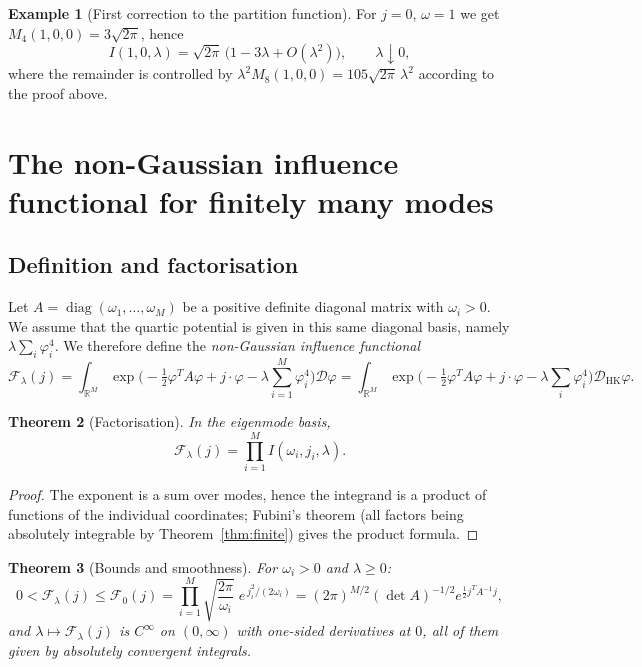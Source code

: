 \documentclass[11pt,a4paper]{article}
\theoremstyle{plain}
\newtheorem{theorem}{Theorem}[section]
\theoremstyle{definition}
\newtheorem{example}[theorem]{Example}
\theoremstyle{remark}
\newcommand{\dphi}{\mathcal{D}\varphi}
\newcommand{\dhk}{\mathcal{D}_{\mathrm{HK}}\varphi}
\newcommand{\R}{\mathbb{R}}
\begin{document}
\begin{example}[First correction to the partition function]
For $j=0$, $\omega=1$ we get $M_4(1,0,0)=3\sqrt{2\pi}$, hence
\[
I(1,0,\lambda)=\sqrt{2\pi}\,\big(1-3\lambda+O(\lambda^{2})\big),\qquad \lambda\downarrow0,
\]
where the remainder is controlled by $\lambda^{2}M_8(1,0,0)=105\sqrt{2\pi}\,\lambda^{2}$
according to the proof above.
\end{example}

\section{The non-Gaussian influence functional for finitely many modes}
\label{sec:influence}

\subsection{Definition and factorisation}

Let \(A = \operatorname{diag}(\omega_1,\dots,\omega_M)\) be a positive definite diagonal
matrix with \(\omega_i>0\). We assume that the quartic potential is given in this same
diagonal basis, namely \(\lambda\sum_i\varphi_i^4\). We therefore define the
\emph{non-Gaussian influence functional}
\begin{equation}
\label{eq:influence}
\mathcal{F}_\lambda(j)
=\int_{\R^{M}}
\exp\!\Big(-\tfrac12\varphi^{T}A\varphi+j\cdot\varphi-\lambda\sum_{i=1}^{M}\varphi_i^{4}\Big)\dphi
=\int_{\R^{M}}
\exp\!\Big(-\tfrac12\varphi^{T}A\varphi+j\cdot\varphi-\lambda\sum_{i}\varphi_i^{4}\Big)\dhk .
\end{equation}

\begin{theorem}[Factorisation]
\label{thm:factor}
In the eigenmode basis,
\[
\mathcal{F}_\lambda(j)=\prod_{i=1}^{M} I(\omega_i,j_i,\lambda).
\]
\end{theorem}

\begin{proof}
The exponent is a sum over modes, hence the integrand is a product of functions of the
individual coordinates; Fubini's theorem (all factors being absolutely integrable by
Theorem~\ref{thm:finite}) gives the product formula.
\end{proof}

\begin{theorem}[Bounds and smoothness]
\label{thm:influencebounds}
For $\omega_i>0$ and $\lambda\ge0$:
\[
0<\mathcal{F}_\lambda(j)\le\mathcal{F}_0(j)
=\prod_{i=1}^{M}\sqrt{\frac{2\pi}{\omega_i}}\;e^{\,j_i^{2}/(2\omega_i)}
=(2\pi)^{M/2}(\det A)^{-1/2}e^{\frac12 j^{T}A^{-1}j},
\]
and $\lambda\mapsto\mathcal{F}_\lambda(j)$ is $C^{\infty}$ on $(0,\infty)$ with
one-sided derivatives at $0$, all of them given by absolutely convergent integrals.
\end{theorem}
\end{document}
